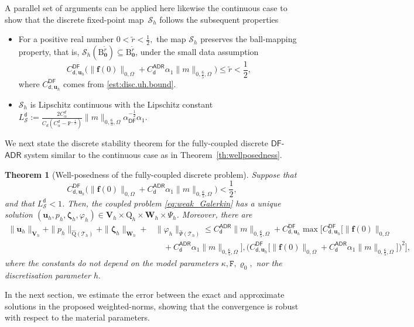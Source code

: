 \documentclass[11pt, reqno, a4paper, twoside]{article}
\newcommand{\bu}{\boldsymbol{u}}
\renewcommand{\bf}{\boldsymbol{f}}
\newcommand\bzeta{\boldsymbol{\zeta}}
\newcommand\bzero{\boldsymbol{0}}
\newcommand{\rF}{\mathtt{F}}
\newcommand{\rQ}{\mathrm{Q}}
\newcommand{\bW}{\mathbf{W}}
\newcommand{\bV}{\mathbf{V}}
\newcommand{\cT}{\mathcal{T}}
\newcommand{\cS}{\mathcal{S}}
\newtheorem{theorem}{Theorem}[section]
\numberwithin{equation}{section}
\numberwithin{remark}{section}
\numberwithin{figure}{section}
\numberwithin{table}{section}
\begin{document}
{{A parallel set of arguments can be applied here likewise the continuous case to show that the discrete fixed-point map~\(\cS_h\) follows the subsequent properties
\begin{itemize}
    \item For a positive real number \(0<\tilde r<\frac12,\) the map \(\cS_h\) preserves the ball-mapping property, that is, \(\cS_h(\mathrm{B}^{\tilde r}_{\bzero})\subseteq\mathrm{B}^{\tilde r}_{\bzero}\), under the {small data assumption}   $${C^{\mathsf{DF}}_{\mathsf{d},\bu_h}}
    \bigl({\|\bf(0)\|_{0,\Omega}}+{C^{\mathsf{ADR}}_{\mathsf{d}}\alpha_1}\|m\|_{0,\frac65,\Omega}\bigr)  \leq \tilde r<\frac12,$$
where $C^{\mathsf{DF}}_{\mathsf{d},\bu_h}$ comes from \eqref{est:disc.uh.bound}.
    \item \(\cS_h\) is Lipschitz continuous with the Lipschitz constant $L^{\mathsf{d}}_{\cS}:=\frac{2C^d_{\alpha}}{C_d(C^d_{\alpha}-\rF^{-\frac13})}\|m\|_{0,\frac65,\Omega}{\alpha}_{\mathsf{DF}}^{-\frac12}\alpha_1.$    
\end{itemize}
\noindent
We next state the discrete stability theorem for the fully-coupled discrete $\mathsf{DF}$-$\mathsf{ADR}$ system similar to the continuous case as in Theorem~\ref{th:wellposedness}.}
\begin{theorem}[Well-posedness of the fully-coupled discrete problem]\label{th:wellposedness.disc}
 Suppose that $${C^{\mathsf{DF}}_{\mathsf{d},\bu_h}}\bigl({\|\bf(0)\|_{0,\Omega}}+{C^{\mathsf{ADR}}_{\mathsf{d}}\alpha_1}\|m\|_{0,\frac65,\Omega}\bigr)  <\frac12,$$ and
that $\displaystyle L^{\mathsf{d}}_{\cS}<1$.  Then, the coupled problem \eqref{eq:weak_Galerkin} has a unique solution $(\bu_h,p_h,\bzeta_h,\varphi_h) \in \bV_h \times \rQ_h\times \bW_h \times \Psi_h$. Moreover, there are 
{{\begin{align*}
   \|\bu_h\|_{\bV_h} + \|p_h\|_{\widehat{\rQ}(\cT_h)} + \|\bzeta_h\|_{\bW_h} + &\|\varphi_h\|_{\widehat{\Psi}(\cT_h)} 
  \leq  C^{\mathsf{ADR}}_{\mathsf{d}}\|m\|_{0,\frac65,\Omega}+C^{\mathsf{DF}}_{\mathsf{d},\bu_h}\max \bigl[{C^{\mathsf{DF}}_{\mathsf{d},\bu_h}}\bigl[{\|\bf(0)\|_{0,\Omega}}\\&\quad + {C^{\mathsf{ADR}}_{\mathsf{d}}\alpha_1}\|m\|_{0,\frac65,\Omega} \bigr],\bigl({{C^{\mathsf{DF}}_{\mathsf{d},\bu_h}}}\bigl[{\|\bf(0)\|_{0,\Omega}}+{C^{\mathsf{ADR}}_{\mathsf{d}}\alpha_1}\|m\|_{0,\frac65,\Omega}\bigr]\bigr)^2\bigr], 
\end{align*}}}
where the constants do not depend on the model parameters $\kappa,\rF,\varrho_0,$ nor the discretisation parameter \(h.\) 
\end{theorem}
}
In the next section, we estimate the error between the exact and approximate solutions in the proposed weighted-norms, showing that the convergence is robust with respect to the material parameters.
\end{document}
